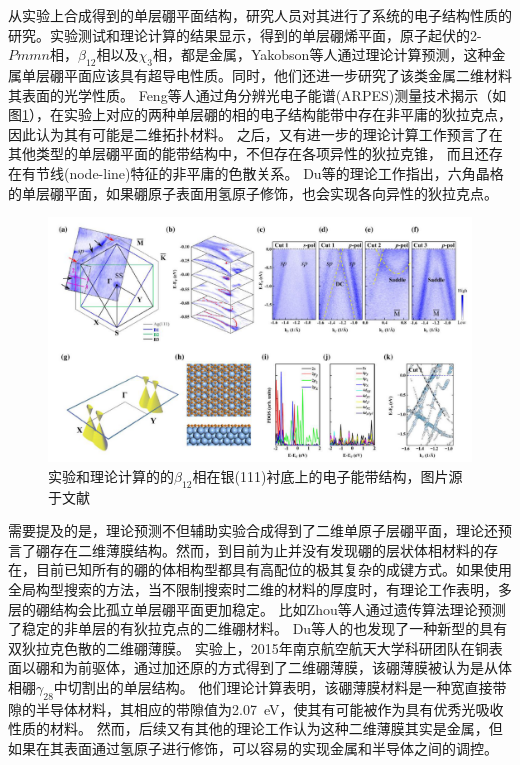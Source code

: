 从实验上合成得到的单层硼平面结构，研究人员对其进行了系统的电子结构性质的研究。实验测试和理论计算的结果显示，得到的单层硼烯平面，原子起伏的2-$Pmmn$相，$\beta_{12}$相以及$\chi_3$相，都是金属\cite{shu2016unveiling}，Yakobson等人\cite{penev2016can}通过理论计算预测，这种金属单层硼平面应该具有超导电性质。同时，他们还进一步研究了该类金属二维材料其表面的光学性质\cite{huang2017two}。
Feng等人\cite{feng2017dirac,feng2018discovery}通过角分辨光电子能谱(ARPES)测量技术揭示（如图\ref{fig:ch1_boron_arpes}），在实验上对应的两种单层硼的相的电子结构能带中存在非平庸的狄拉克点，因此认为其有可能是二维拓扑材料。
之后，又有进一步的理论计算工作预言了在其他类型的单层硼平面的能带结构中，不但存在各项异性的狄拉克锥， 而且还存在有节线(node-line)特征的非平庸的色散关系\cite{zhang2017dirac}。
Du等\cite{jiao2016two}的理论工作指出，六角晶格的单层硼平面，如果硼原子表面用氢原子修饰，也会实现各向异性的狄拉克点。

\begin{figure}[bt]
  \includegraphics[width=1.0\textwidth]{figs/ch1_boron_arpes.png}
  \centering
  \caption{实验和理论计算的的$\beta_{12}$相在银(111)衬底上的电子能带结构，图片源于文献\cite{feng2017dirac}}
  \label{fig:ch1_boron_arpes}
\end{figure}

需要提及的是，理论预测不但辅助实验合成得到了二维单原子层硼平面，理论还预言了硼存在二维薄膜结构。然而，到目前为止并没有发现硼的层状体相材料的存在，目前已知所有的硼的体相构型都具有高配位的极其复杂的成键方式。如果使用全局构型搜索的方法，当不限制搜索时二维的材料的厚度时，有理论工作表明，多层的硼结构会比孤立单层硼平面更加稳定。
比如Zhou等人\cite{zhou2014semimetallic}通过遗传算法理论预测了稳定的非单层的有狄拉克点的二维硼材料。
Du等人\cite{ma2016graphene}的也发现了一种新型的具有双狄拉克色散的二维硼薄膜。
实验上，2015年南京航空航天大学科研团队在铜表面以硼和为前驱体，通过加还原的方式得到了二维硼薄膜\cite{tai2015synthesis}，该硼薄膜被认为是从体相硼$\gamma_{28}$中切割出的单层结构。
他们理论计算表明，该硼薄膜材料是一种宽直接带隙的半导体材料，其相应的带隙值为\SI{2.07}{\eV}，使其有可能被作为具有优秀光吸收性质的材料。
然而，后续又有其他的理论工作\cite{kou2016high}认为这种二维薄膜其实是金属，但如果在其表面通过氢原子进行修饰，可以容易的实现金属和半导体之间的调控。

